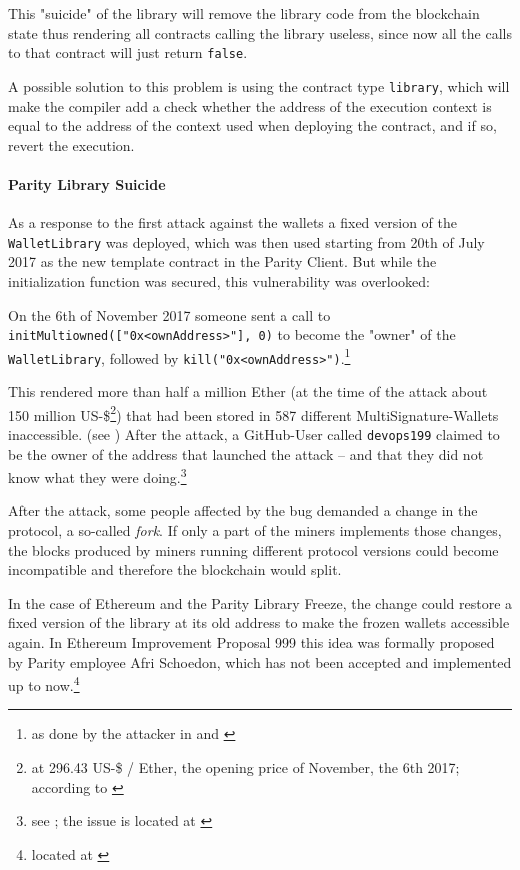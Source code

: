 This "suicide" of the library will remove the library code from the blockchain state thus rendering all contracts calling the library useless, since now all the calls to that contract will just return \texttt{false}.

A possible solution to this problem is using the contract type \texttt{library}, which will make the compiler add a check whether the address of the execution context is equal to the address of the context used when deploying the contract, and if so, revert the execution.

\paragraph{Parity Library Suicide}
As a response to the first attack against the wallets a fixed version of the \texttt{WalletLibrary} was deployed, which was then used starting from 20th of July 2017 as the new template contract in the Parity Client. But while the initialization function was secured, this vulnerability was overlooked:

On  the 6th of November 2017 someone sent a call to \texttt{initMultiowned(["0x<ownAddress>"], 0)} to become the "owner" of the \texttt{WalletLibrary}, followed by \texttt{kill("0x<ownAddress>")}.\footnote{as done by the attacker in \cite{etherscan:walletfreeze:init} and \cite{etherscan:walletfreeze:kill}}

This rendered more than half a million Ether (at the time of the attack about 150 million US-\$\footnote{at 296.43 US-\$ / Ether, the opening price of November, the 6th 2017; according to \cite{coinmarketcap:parityfreeze}}) that had been stored in 587 different MultiSignature-Wallets inaccessible. (see \cite{parity:postmortem}) After the attack, a GitHub-User called \texttt{devops199} claimed to be the owner of the address that launched the attack -- and that they did not know what they were doing.\footnote{see \cite{springrole:parityfreeze}; the issue is located at \cite{github:devops199}}

After the attack, some people affected by the bug demanded a change in the protocol, a so-called \textit{fork}. If only a part of the miners implements those changes, the blocks produced by miners running different protocol versions could become incompatible and therefore the blockchain would split.

In the case of Ethereum and the Parity Library Freeze, the change could restore a fixed version of the library at its old address to make the frozen wallets accessible again. In Ethereum Improvement Proposal 999 this idea was formally proposed by Parity employee Afri Schoedon, which has not been accepted and implemented up to now.\footnote{located at \cite{github:eic999}}

